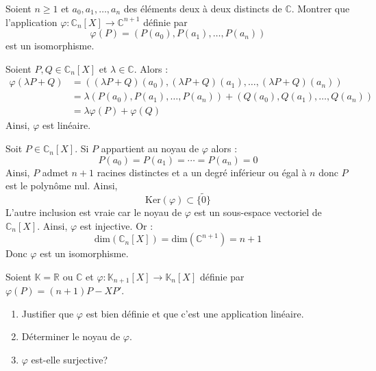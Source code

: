 \documentclass[a4paper,10pt]{report}
\begin{document}
\everymath{\displaystyle}

\begin{center}
\end{center}

\bigskip



\begin{Exa} Soient $n \geq 1$ et $a_{0} ,a_{1} , \ldots ,a_{n}$ des éléments deux à deux distincts de $\mathbb{C}$. Montrer que l'application $\varphi \colon \mathbb{C}_n[X] \rightarrow \mathbb{C}^{n+1}$ définie par
  \[
  \varphi(P) = (P(a_{0}),P(a_{1}), \ldots ,P(a_{n}))
  \]
  est un isomorphisme.
\end{Exa}

\corr Soient $P,Q \in \mathbb{C}_n[X]$ et $\lambda \in \mathbb{C}$. Alors :
\begin{align*}
\varphi(\lambda P + Q ) & = ((\lambda P+Q)(a_{0}),(\lambda P+Q)(a_{1}), \ldots , (\lambda P+Q)(a_{n})) \\
& = \lambda (P(a_{0}),P(a_{1}), \ldots ,P(a_{n})) + (Q(a_{0}),Q(a_{1}), \ldots ,Q(a_{n})) \\
& = \lambda \varphi(P) + \varphi(Q)
\end{align*}
Ainsi, $\varphi$ est linéaire.

\medskip

\noindent Soit $P \in \mathbb{C}_n[X]$. Si $P$ appartient au noyau de $\varphi$ alors :
$$ P(a_0) = P(a_1) = \cdots = P(a_n) = 0$$
Ainsi, $P$ admet $n+1$ racines distinctes et a un degré inférieur ou égal à $n$ donc $P$ est le polynôme nul. Ainsi,
$$ \textrm{Ker}(\varphi) \subset \lbrace \tilde{0} \rbrace$$
L'autre inclusion est vraie car le noyau de $\varphi$ est un sous-espace vectoriel de $\mathbb{C}_n[X]$. Ainsi, $\varphi$ est injective. Or :
$$ \textrm{dim}(\mathbb{C}_n[X]) = \textrm{dim}(\mathbb{C}^{n+1}) = n+1$$
Donc $\varphi$ est un isomorphisme.


\begin{Exa} Soient $\mathbb{K}= \mathbb{R}$ ou $\mathbb{C}$ et $\varphi : \mathbb{K}_{n+1}[X]\rightarrow \mathbb{K}_{n}[X]$ définie par $\varphi(P) = (n + 1)P - XP'$.
    \begin{enumerate}
      \item
        Justifier que $\varphi$ est bien définie et que c'est une application linéaire.
      \item
        Déterminer le noyau de $\varphi$.
      \item
        $\varphi$ est-elle surjective?
    \end{enumerate}
\end{Exa}
\end{document}
